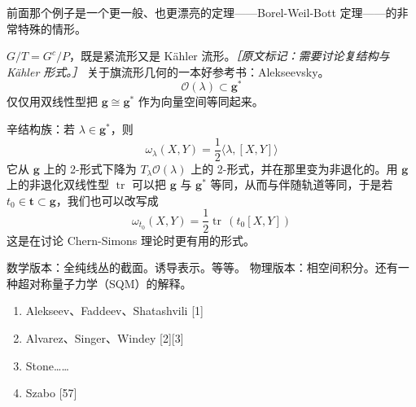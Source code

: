 前面那个例子是一个更一般、也更漂亮的定理——Borel-Weil-Bott 定理——的非常特殊的情形。

$G/T=G^{c}/P$，既是紧流形又是 Kähler 流形。{\small\itshape ［原文标记：需要讨论复结构与 Kähler 形式。］}
关于旗流形几何的一本好参考书：Alekseevsky。
\begin{equation}
  \mathcal{O}(\lambda)\subset\mathbf{g}^*
  \tag{B.35}
  \label{eq:B.35}
\end{equation}
仅仅用双线性型把 $\mathbf{g}\cong\mathbf{g}^*$ 作为向量空间等同起来。

辛结构族：若 $\lambda\in\mathbf{g}^*$，则
\begin{equation}
  \omega_\lambda(X,Y)=\frac{1}{2}\langle\lambda,[X,Y]\rangle
  \tag{B.36}
  \label{eq:B.36}
\end{equation}
它从 $\mathbf{g}$ 上的 2-形式下降为 $T_\lambda\mathcal{O}(\lambda)$ 上的 2-形式，并在那里变为非退化的。用 $\mathbf{g}$ 上的非退化双线性型 $\operatorname{tr}$ 可以把 $\mathbf{g}$ 与 $\mathbf{g}^*$ 等同，从而与伴随轨道等同，于是若 $t_0\in\mathbf{t}\subset\mathbf{g}$，我们也可以改写成
\begin{equation}
  \omega_{t_0}(X,Y)=\frac{1}{2}\operatorname{tr}\,(t_0[X,Y])
  \tag{B.37}
  \label{eq:B.37}
\end{equation}
这是在讨论 Chern-Simons 理论时更有用的形式。

数学版本：全纯线丛的截面。诱导表示。等等。
物理版本：相空间积分。还有一种超对称量子力学（SQM）的解释。

\begin{enumerate}
  \item Alekseev、Faddeev、Shatashvili [1]
  \item Alvarez、Singer、Windey [2][3]
  \item Stone……
  \item Szabo [57]
\end{enumerate}

